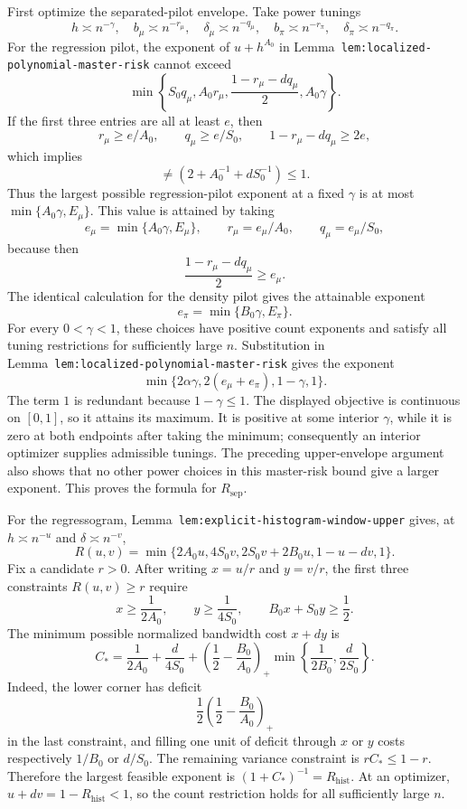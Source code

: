 First optimize the separated-pilot envelope. Take power tunings
\[
h\asymp n^{-\gamma},
\quad b_\mu\asymp n^{-r_\mu},
\quad\delta_\mu\asymp n^{-q_\mu},
\quad b_\pi\asymp n^{-r_\pi},
\quad\delta_\pi\asymp n^{-q_\pi}.
\]
For the regression pilot, the exponent of \(u+h^{A_0}\) in Lemma~\texttt{lem:localized-polynomial-master-risk} cannot exceed
\[
\min\left\{S_0q_\mu,A_0r_\mu,
\frac{1-r_\mu-dq_\mu}{2},A_0\gamma\right\}.
\]
If the first three entries are all at least \(e\), then
\[
r_\mu\ge e/A_0,
\qquad q_\mu\ge e/S_0,
\qquad 1-r_\mu-dq_\mu\ge2e,
\]
which implies
\[\ne\left(2+A_0^{-1}+dS_0^{-1}\right)\le1.
\]
Thus the largest possible regression-pilot exponent at a fixed \(\gamma\) is at most \(\min\{A_0\gamma,E_\mu\}\). This value is attained by taking
\[
e_\mu=\min\{A_0\gamma,E_\mu\},
\qquad r_\mu=e_\mu/A_0,
\qquad q_\mu=e_\mu/S_0,
\]
because then
\[
\frac{1-r_\mu-dq_\mu}{2}\ge e_\mu.
\]
The identical calculation for the density pilot gives the attainable exponent
\[
e_\pi=\min\{B_0\gamma,E_\pi\}.
\]
For every \(0<\gamma<1\), these choices have positive count exponents and satisfy all tuning restrictions for sufficiently large \(n\). Substitution in Lemma~\texttt{lem:localized-polynomial-master-risk} gives the exponent
\[
\min\{2\alpha\gamma,2(e_\mu+e_\pi),1-\gamma,1\}.
\]
The term \(1\) is redundant because \(1-\gamma\le1\). The displayed objective is continuous on \([0,1]\), so it attains its maximum. It is positive at some interior \(\gamma\), while it is zero at both endpoints after taking the minimum; consequently an interior optimizer supplies admissible tunings. The preceding upper-envelope argument also shows that no other power choices in this master-risk bound give a larger exponent. This proves the formula for \(R_{\mathrm{sep}}\).

For the regressogram, Lemma~\texttt{lem:explicit-histogram-window-upper} gives, at \(h\asymp n^{-u}\) and \(\delta\asymp n^{-v}\),
\[
R(u,v)=\min\{2A_0u,4S_0v,2S_0v+2B_0u,1-u-dv,1\}.
\]
Fix a candidate \(r>0\). After writing \(x=u/r\) and \(y=v/r\), the first three constraints \(R(u,v)\ge r\) require
\[
x\ge\frac1{2A_0},
\qquad y\ge\frac1{4S_0},
\qquad B_0x+S_0y\ge\frac12.
\]
The minimum possible normalized bandwidth cost \(x+dy\) is
\[
C_*=\frac1{2A_0}+\frac d{4S_0}
+\left(\frac12-\frac{B_0}{A_0}\right)_+
\min\left\{\frac1{2B_0},\frac d{2S_0}\right\}.
\]
Indeed, the lower corner has deficit
\[
\frac12\left(\frac12-\frac{B_0}{A_0}\right)_+
\]
in the last constraint, and filling one unit of deficit through \(x\) or \(y\) costs respectively \(1/B_0\) or \(d/S_0\). The remaining variance constraint is \(rC_*\le1-r\). Therefore the largest feasible exponent is \((1+C_*)^{-1}=R_{\mathrm{hist}}\). At an optimizer, \(u+dv=1-R_{\mathrm{hist}}<1\), so the count restriction holds for all sufficiently large \(n\).

